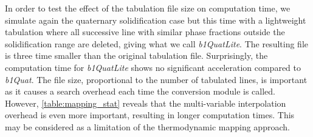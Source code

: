 In order to test the effect of the tabulation file size on computation time, we simulate again the quaternary solidification case but this time with a lightweight
tabulation where all successive line with similar phase fractions outside the solidification range are deleted, giving what we call \emph{b1QuatLite}. The 
resulting file is three time smaller than the original tabulation file. Surprisingly, the computation time for \emph{b1QuatLite} shows no significant acceleration 
compared to \emph{b1Quat}. The file size, proportional to the number of tabulated lines, is important as it causes a search overhead each time the conversion module
is called. However, \cref{table:mapping_stat} reveals that the multi-variable interpolation overhead is even more important, resulting in longer computation times.
This may be considered as a limitation of the thermodynamic mapping approach.



